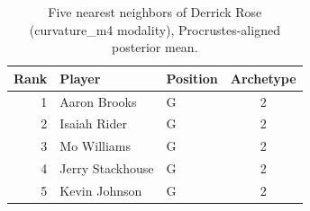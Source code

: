 \begin{table}[htbp]
  \centering\small
  \begin{tabular}{rllc}
    \toprule
    Rank & Player & Position & Archetype \\
    \midrule
    1 & Aaron Brooks & G & 2 \\
    2 & Isaiah Rider & G & 2 \\
    3 & Mo Williams & G & 2 \\
    4 & Jerry Stackhouse & G & 2 \\
    5 & Kevin Johnson & G & 2 \\
    \bottomrule
  \end{tabular}
  \caption{Five nearest neighbors of Derrick Rose (curvature_m4 modality), Procrustes-aligned posterior mean.}
  \label{tab:Derrick_Rose_neighbors_curvature_m4}
\end{table}


